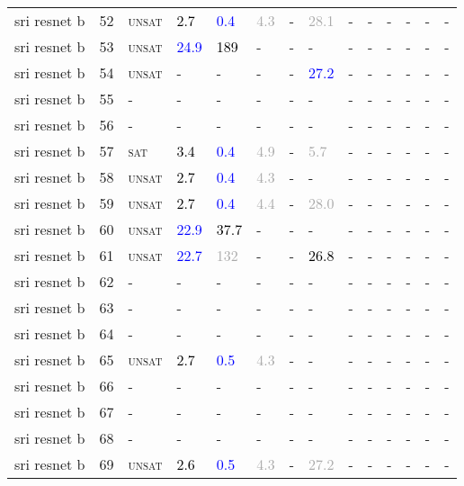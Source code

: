 \begin{center}
{\begin{longtable}{@{}llllllllllllll@{}}
sri resnet b & 52 & \textsc{unsat} & \textcolor{black}{2.7} & \textcolor{blue}{0.4} & \textcolor{darkgray}{4.3} & - & \textcolor{darkgray}{28.1} & - & - & - & - & - & - \\
sri resnet b & 53 & \textsc{unsat} & \textcolor{blue}{24.9} & \textcolor{black}{189} & - & - & - & - & - & - & - & - & - \\
sri resnet b & 54 & \textsc{unsat} & - & - & - & - & \textcolor{blue}{27.2} & - & - & - & - & - & - \\
sri resnet b & 55 & - & - & - & - & - & - & - & - & - & - & - & - \\
sri resnet b & 56 & - & - & - & - & - & - & - & - & - & - & - & - \\
sri resnet b & 57 & \textsc{sat} & \textcolor{black}{3.4} & \textcolor{blue}{0.4} & \textcolor{darkgray}{4.9} & - & \textcolor{darkgray}{5.7} & - & - & - & - & - & - \\
sri resnet b & 58 & \textsc{unsat} & \textcolor{black}{2.7} & \textcolor{blue}{0.4} & \textcolor{darkgray}{4.3} & - & - & - & - & - & - & - & - \\
sri resnet b & 59 & \textsc{unsat} & \textcolor{black}{2.7} & \textcolor{blue}{0.4} & \textcolor{darkgray}{4.4} & - & \textcolor{darkgray}{28.0} & - & - & - & - & - & - \\
sri resnet b & 60 & \textsc{unsat} & \textcolor{blue}{22.9} & \textcolor{black}{37.7} & - & - & - & - & - & - & - & - & - \\
sri resnet b & 61 & \textsc{unsat} & \textcolor{blue}{22.7} & \textcolor{darkgray}{132} & - & - & \textcolor{black}{26.8} & - & - & - & - & - & - \\
sri resnet b & 62 & - & - & - & - & - & - & - & - & - & - & - & - \\
sri resnet b & 63 & - & - & - & - & - & - & - & - & - & - & - & - \\
sri resnet b & 64 & - & - & - & - & - & - & - & - & - & - & - & - \\
sri resnet b & 65 & \textsc{unsat} & \textcolor{black}{2.7} & \textcolor{blue}{0.5} & \textcolor{darkgray}{4.3} & - & - & - & - & - & - & - & - \\
sri resnet b & 66 & - & - & - & - & - & - & - & - & - & - & - & - \\
sri resnet b & 67 & - & - & - & - & - & - & - & - & - & - & - & - \\
sri resnet b & 68 & - & - & - & - & - & - & - & - & - & - & - & - \\
sri resnet b & 69 & \textsc{unsat} & \textcolor{black}{2.6} & \textcolor{blue}{0.5} & \textcolor{darkgray}{4.3} & - & \textcolor{darkgray}{27.2} & - & - & - & - & - & - \\

\end{longtable}}
\end{center}

